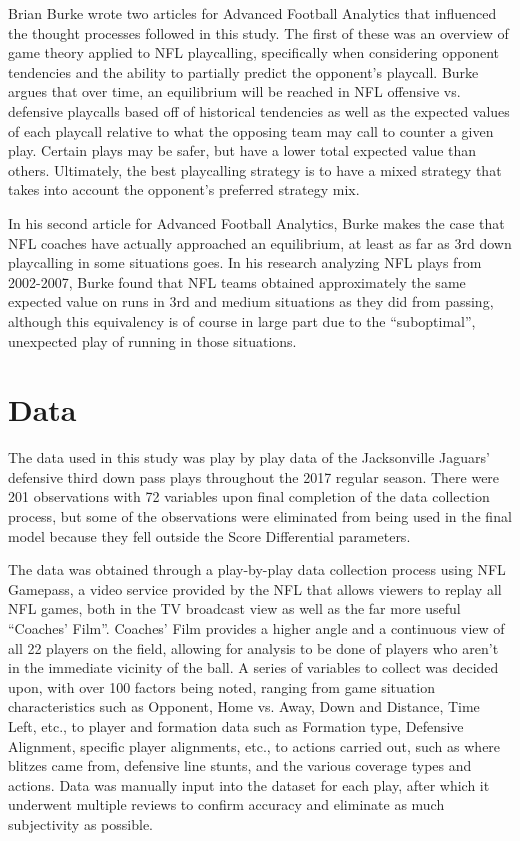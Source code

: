 \documentclass{article}
\begin{document}
	Brian Burke wrote two articles for Advanced Football Analytics that influenced the thought processes followed in this study. The first of these was an overview of game theory applied to NFL playcalling, specifically when considering opponent tendencies and the ability to partially predict the opponent’s playcall. Burke argues that over time, an equilibrium will be reached in NFL offensive vs. defensive playcalls based off of historical tendencies as well as the expected values of each playcall relative to what the opposing team may call to counter a given play. Certain plays may be safer, but have  a lower total expected value than others. Ultimately, the best playcalling strategy is to have a mixed strategy that takes into account the opponent’s preferred strategy mix. 
	
	In his second article for Advanced Football Analytics, Burke makes the case that NFL coaches have actually approached an equilibrium, at least as far as 3rd down playcalling in some situations goes. In his research analyzing NFL plays from 2002-2007, Burke found that NFL teams obtained approximately the same expected value on runs in 3rd and medium situations as they did from passing, although this equivalency is of course in large part due to the “suboptimal”, unexpected play of running in those situations. 





\section{Data}


	The data used in this study was play by play data of the Jacksonville Jaguars’ defensive third down pass plays throughout the 2017 regular season. There were 201 observations with 72 variables upon final completion of the data collection process, but some of the observations were eliminated from being used in the final model because they fell outside the Score Differential parameters. 
	
    The data was obtained through  a play-by-play data collection process using NFL Gamepass, a video service provided by the NFL that allows viewers to replay all NFL games, both in the TV broadcast view as well as the far more useful “Coaches’ Film”. Coaches’ Film provides a higher angle and a continuous view of all 22 players on the field, allowing for analysis to be done of players who aren’t in the immediate vicinity of the ball. A series of variables to collect was decided upon, with over 100 factors being noted, ranging from game situation characteristics such as Opponent, Home vs. Away, Down and Distance, Time Left, etc., to player and formation data such as Formation type, Defensive Alignment, specific player alignments, etc., to actions carried out, such as where blitzes came from, defensive line stunts, and the various coverage types and actions. Data was manually input into the dataset for each play, after which it underwent multiple reviews to confirm accuracy and eliminate as much subjectivity as possible. 
\end{document}
